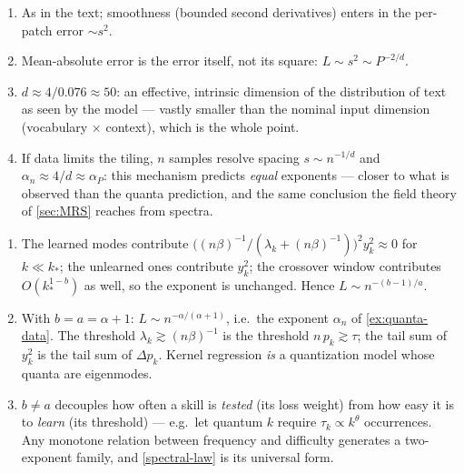 \documentclass[11pt]{article}
\begin{document}
\begin{solution}[ex:manifold]
\begin{enumerate}
  \item As in the text; smoothness (bounded second derivatives) enters in the per-patch error $\sim s^2$.
  \item Mean-absolute error is the error itself, not its square: $L\sim s^2 \sim P^{-2/d}$.
  \item $d \approx 4/0.076 \approx 50$: an effective, intrinsic dimension of the distribution of text as seen by the model --- vastly smaller than the nominal input dimension (vocabulary $\times$ context), which is the whole point.
  \item If data limits the tiling, $n$ samples resolve spacing $s\sim n^{-1/d}$ and $\alpha_n \approx 4/d \approx \alpha_P$: this mechanism predicts \emph{equal} exponents --- closer to what is observed than the quanta prediction, and the same conclusion the field theory of \cref{sec:MRS} reaches from spectra.
\end{enumerate}
\end{solution}

\begin{solution}[ex:spectra]
\begin{enumerate}
  \item The learned modes contribute $\big((n\beta)^{-1}/(\lambda_k + (n\beta)^{-1})\big)^2 y_k^2 \approx 0$ for $k\ll k_*$; the unlearned ones contribute $y_k^2$; the crossover window contributes $O(k_*^{1-b})$ as well, so the exponent is unchanged. Hence $L \sim n^{-(b-1)/a}$.
  \item With $b=a=\alpha+1$: $L\sim n^{-\alpha/(\alpha+1)}$, i.e.\ the exponent $\alpha_n$ of \cref{ex:quanta-data}. The threshold $\lambda_k \gtrsim (n\beta)^{-1}$ is the threshold $n\, p_k \gtrsim \tau$; the tail sum of $y_k^2$ is the tail sum of $\Delta p_k$. Kernel regression \emph{is} a quantization model whose quanta are eigenmodes.
  \item $b\neq a$ decouples how often a skill is \emph{tested} (its loss weight) from how easy it is to \emph{learn} (its threshold) --- e.g.\ let quantum $k$ require $\tau_k \propto k^{\theta}$ occurrences. Any monotone relation between frequency and difficulty generates a two-exponent family, and \eqref{spectral-law} is its universal form.
\end{enumerate}
\end{solution}
\end{document}
